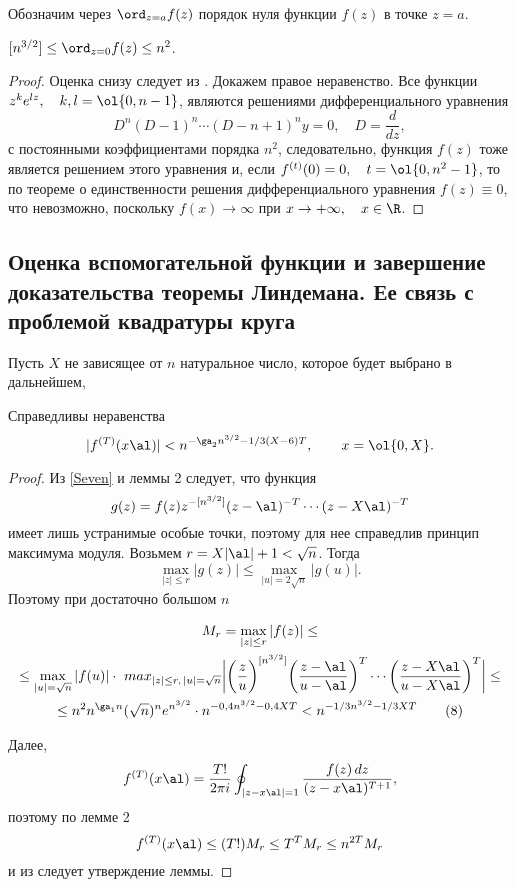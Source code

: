 \documentclass{article}
\begin{document}
Обозначим через $\ord_{z=a}f(z)$  порядок нуля функции $f(z)$  в точке
$z=a$.

\begin{lemma}
$[n^{3/2}] \le \ord_{z=0}f(z) \le n^2$.
\end{lemma}
\begin{proof}
Оценка снизу следует из . Докажем правое
неравенство.  Все функции $z^ke^{lz}, \quad k,l= \ol{0,n-1}$, являются решениями
дифференциального уравнения
$$
D^n(D-1)^n \cdots (D-n+1)^ny=0, \quad D=\frac d{dz},
$$
с постоянными коэффициентами порядка $n^2$, следовательно, функция  $f(z)$
тоже является решением этого уравнения и, если $f^{(t)}(0)=0, \quad
t=\ol{0,n^2-1}$, то по теореме о единственности решения дифференциального
уравнения  $f(z) \equiv 0$, что невозможно, поскольку $f(x) \to \infty$ при
$x\to  +\infty, \quad x\in\R$.
\end{proof}

\subsection{Оценка вспомогательной функции и завершение доказательства
теоремы Линдемана. Ее связь с проблемой квадратуры круга}

Пусть $X$  не зависящее от $n$
натуральное число, которое будет выбрано в дальнейшем,

\begin{lemma}
Справедливы неравенства
$$
|f^{(T)}(x \al)| < n^{-\ga_2n^{3/2}-1/3(X-6)T}, \qquad x=\ol{0,X}.
$$
\end{lemma}
\begin{proof}
Из \eqref{Seven} и леммы 2 следует, что функция
$$
g(z)=f(z)z^{-[n^{3/2}]}(z-\al)^{-T} \cdots (z-X\al)^{-T}
$$
имеет лишь устранимые особые точки, поэтому для нее справедлив принцип
максимума модуля. Возьмем $r=X|\al |+1<\sqrt n$. Тогда
$$
\max_{|z| \le r}|g(z)| \le \max_{|u|=2\sqrt n}|g(u)|.
$$
Поэтому   при достаточно большом $n$

\begin{gather}
M_r=\max_{|z| \le r}|f(z)| \le  \\
\le\max_{|u|=\sqrt n}|f(u)| \cdot \
max_{|z| \le r,\,  |u|=\sqrt n}
\biggl|\biggl(\frac zu \biggr)^{[n^{3/2}]}
\biggl(\frac{z-\al}{u-\al}\biggr)^T   \cdots
\biggl(\frac{z-X\al}{u-X\al}\biggr)^T \biggr| \le \\
\le n^2n^{\ga_1n}(\sqrt n)^n e^{n^{3/2}}\cdot
 n^{-0,4n^{3/2}-0,4XT}<n^{-1/3n^{3/2}-1/3XT}
\tag 8
\end{gather}

Далее,
$$
f^{(T)}(x\al)= \frac{T!}{2\pi i}\oint_{|z-x\al|=1}
\frac {f(z)\,dz}{(z-x\al)^{T+1}},
$$
поэтому по лемме 2
$$
f^{(T)}(x\al) \le (T!)M_r \le T^TM_r \le n^{2T}M_r
$$
и из  следует утверждение леммы.
\end{proof}
\end{document}
